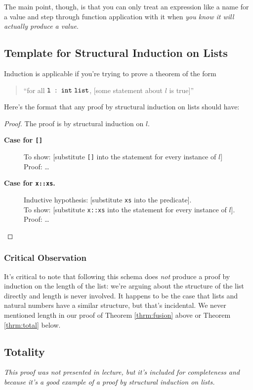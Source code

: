 \documentclass[11pt]{article}
\newcommand{\ttt}[1]{\texttt{#1}}
\begin{document}
The main point, though, is that you can only treat an expression like a
name for a value and step through function application with it when
\emph{you know it will actually produce a value}.

\subsection{Template for Structural Induction on Lists}

Induction is applicable if you're trying to prove a theorem of the form
\begin{quote}
  ``for all ${\mathtt{l}}\ :\ {{\mathtt{int}}~\mathtt{list}}$, [some statement about $l$ is
    true]''
\end{quote}
Here's the format that any proof by structural induction on lists should
have:
\begin{framed}
\begin{proof}
The proof is by structural induction on $l$.

\begin{description}
\item [\textbf{Case for \ttt{[]}}]
  To show: [substitute \ttt{[]} into the statement for every instance of $l$] \\
  Proof: \ldots

\item [\textbf{Case for \ttt{x::xs}.}]  Inductive hypothesis: [substitute
  \ttt{xs} into the predicate].\\
  To show: [substitute \ttt{x::xs} into the statement for every instance of $l$].\\
  Proof: \ldots
\end{description}
\end{proof}
\end{framed}

\subsubsection{Critical Observation}
It's critical to note that following this schema does \emph{not} produce a
proof by induction on the length of the list: we're arguing about the
structure of the list directly and length is never involved. It happens to
be the case that lists and natural numbers have a similar structure, but
that's incidental. We never mentioned length in our proof of Theorem
\ref{thrm:fusion} above or Theorem \ref{thrm:total} below.

\subsection{Totality}
\textit{This proof was not presented in lecture, but it's included for
  completeness and because it's a good example of a proof by structural
  induction on lists.}
\end{document}
